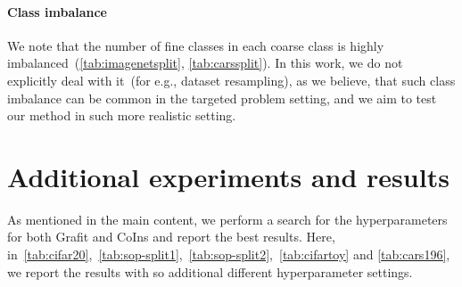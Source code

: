 \documentclass[10pt,twocolumn,letterpaper]{article}
\begin{document}
\paragraph{Class imbalance}
We note that the number of fine classes in each coarse class is highly imbalanced~(\cref{tab:imagenetsplit}, \cref{tab:carssplit}). In this work, we do not explicitly deal with it~(for e.g., dataset resampling), as we believe, that such class imbalance can be common in the targeted problem setting, and we aim to test our method in such more realistic setting. 

\section{Additional experiments and results}\label{appendixb}

As mentioned in the main content, we perform a search for the hyperparameters for both Grafit and CoIns and report the best results. Here, in~\cref{tab:cifar20},~\cref{tab:sop-split1},~\cref{tab:sop-split2},~\cref{tab:cifartoy} and \cref{tab:cars196}, we report the results with so additional different hyperparameter settings.
\end{document}
